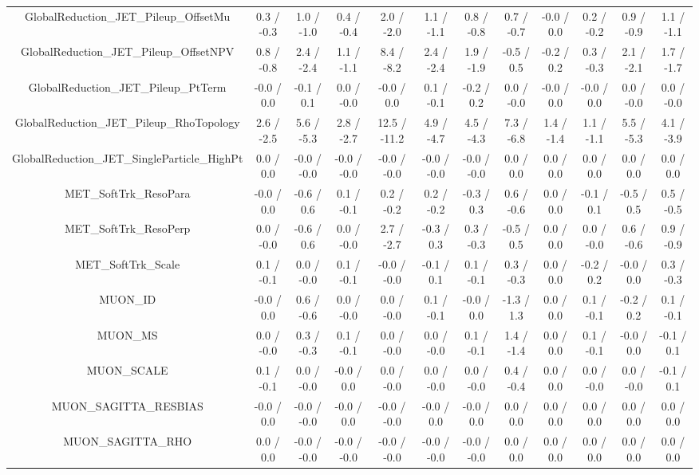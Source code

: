 \begin{table}[htbp]
\begin{center}
\begin{tabular}{|c|c|c|c|c|c|c|c|c|c|c|c|}
  GlobalReduction_JET_Pileup_OffsetMu & 0.3 / -0.3 & 1.0 / -1.0 & 0.4 / -0.4 & 2.0 / -2.0 & 1.1 / -1.1 & 0.8 / -0.8 & 0.7 / -0.7 & -0.0 / 0.0 & 0.2 / -0.2 & 0.9 / -0.9 & 1.1 / -1.1 \\ 
  GlobalReduction_JET_Pileup_OffsetNPV & 0.8 / -0.8 & 2.4 / -2.4 & 1.1 / -1.1 & 8.4 / -8.2 & 2.4 / -2.4 & 1.9 / -1.9 & -0.5 / 0.5 & -0.2 / 0.2 & 0.3 / -0.3 & 2.1 / -2.1 & 1.7 / -1.7 \\ 
  GlobalReduction_JET_Pileup_PtTerm & -0.0 / 0.0 & -0.1 / 0.1 & 0.0 / -0.0 & -0.0 / 0.0 & 0.1 / -0.1 & -0.2 / 0.2 & 0.0 / -0.0 & -0.0 / 0.0 & -0.0 / 0.0 & 0.0 / -0.0 & 0.0 / -0.0 \\ 
  GlobalReduction_JET_Pileup_RhoTopology & 2.6 / -2.5 & 5.6 / -5.3 & 2.8 / -2.7 & 12.5 / -11.2 & 4.9 / -4.7 & 4.5 / -4.3 & 7.3 / -6.8 & 1.4 / -1.4 & 1.1 / -1.1 & 5.5 / -5.3 & 4.1 / -3.9 \\ 
  GlobalReduction_JET_SingleParticle_HighPt & 0.0 / 0.0 & -0.0 / -0.0 & -0.0 / -0.0 & -0.0 / -0.0 & -0.0 / -0.0 & -0.0 / -0.0 & 0.0 / 0.0 & 0.0 / 0.0 & 0.0 / 0.0 & 0.0 / 0.0 & 0.0 / 0.0 \\ 
  MET_SoftTrk_ResoPara & -0.0 / 0.0 & -0.6 / 0.6 & 0.1 / -0.1 & 0.2 / -0.2 & 0.2 / -0.2 & -0.3 / 0.3 & 0.6 / -0.6 & 0.0 / 0.0 & -0.1 / 0.1 & -0.5 / 0.5 & 0.5 / -0.5 \\ 
  MET_SoftTrk_ResoPerp & 0.0 / -0.0 & -0.6 / 0.6 & 0.0 / -0.0 & 2.7 / -2.7 & -0.3 / 0.3 & 0.3 / -0.3 & -0.5 / 0.5 & 0.0 / 0.0 & 0.0 / -0.0 & 0.6 / -0.6 & 0.9 / -0.9 \\ 
  MET_SoftTrk_Scale & 0.1 / -0.1 & 0.0 / -0.0 & 0.1 / -0.1 & -0.0 / -0.0 & -0.1 / 0.1 & 0.1 / -0.1 & 0.3 / -0.3 & 0.0 / 0.0 & -0.2 / 0.2 & -0.0 / 0.0 & 0.3 / -0.3 \\ 
  MUON_ID & -0.0 / 0.0 & 0.6 / -0.6 & 0.0 / -0.0 & 0.0 / -0.0 & 0.1 / -0.1 & -0.0 / 0.0 & -1.3 / 1.3 & 0.0 / 0.0 & 0.1 / -0.1 & -0.2 / 0.2 & 0.1 / -0.1 \\ 
  MUON_MS & 0.0 / -0.0 & 0.3 / -0.3 & 0.1 / -0.1 & 0.0 / -0.0 & 0.0 / -0.0 & 0.1 / -0.1 & 1.4 / -1.4 & 0.0 / 0.0 & 0.1 / -0.1 & -0.0 / 0.0 & -0.1 / 0.1 \\ 
  MUON_SCALE & 0.1 / -0.1 & 0.0 / -0.0 & -0.0 / 0.0 & 0.0 / -0.0 & 0.0 / -0.0 & 0.0 / -0.0 & 0.4 / -0.4 & 0.0 / 0.0 & 0.0 / -0.0 & 0.0 / -0.0 & -0.1 / 0.1 \\ 
  MUON_SAGITTA_RESBIAS & -0.0 / 0.0 & -0.0 / -0.0 & -0.0 / 0.0 & -0.0 / -0.0 & -0.0 / 0.0 & -0.0 / 0.0 & 0.0 / 0.0 & 0.0 / 0.0 & 0.0 / 0.0 & 0.0 / 0.0 & 0.0 / 0.0 \\ 
  MUON_SAGITTA_RHO & 0.0 / 0.0 & -0.0 / -0.0 & -0.0 / -0.0 & -0.0 / -0.0 & -0.0 / -0.0 & -0.0 / -0.0 & 0.0 / 0.0 & 0.0 / 0.0 & 0.0 / 0.0 & 0.0 / 0.0 & 0.0 / 0.0 \\ 

\end{tabular}
\end{center}
\end{table}
